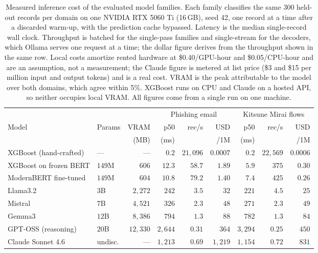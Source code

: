 \documentclass{jmlr}
\begin{document}
\begin{table}[tbp]
\centering
\caption{Measured inference cost of the evaluated model families. Each family classifies the same 300 held-out records per domain on one NVIDIA RTX 5060 Ti (16\,GB), seed 42, one record at a time after a discarded warm-up, with the prediction cache bypassed. Latency is the median single-record wall clock. Throughput is batched for the single-pass families and single-stream for the decoders, which Ollama serves one request at a time; the dollar figure derives from the throughput shown in the same row. Local costs amortize rented hardware at \$0.40/GPU-hour and \$0.05/CPU-hour and are an assumption, not a measurement; the Claude figure is metered at list price (\$3 and \$15 per million input and output tokens) and is a real cost. VRAM is the peak attributable to the model over both domains, which agree within 5\%. XGBoost runs on CPU and Claude on a hosted API, so neither occupies local VRAM. All figures come from a single run on one machine.}
\label{tab:cost-structure}
\footnotesize
\setlength{\tabcolsep}{4pt}
\begin{tabular}{@{}llrrrrrrr@{}}
\toprule
 & & & \multicolumn{3}{c}{Phishing email} & \multicolumn{3}{c}{Kitsune Mirai flows} \\
\cmidrule(lr){4-6}\cmidrule(lr){7-9}
Model & Params & VRAM & p50 & rec/s & USD & p50 & rec/s & USD \\
 & & (MB) & (ms) & & /1M & (ms) & & /1M \\
\midrule
XGBoost (hand-crafted) & --- & --- & $0.2$ & $21{,}096$ & $0.0007$ & $0.2$ & $22{,}569$ & $0.0006$ \\
XGBoost on frozen BERT & $149$M & $606$ & $12.3$ & $58.7$ & $1.89$ & $5.9$ & $375$ & $0.30$ \\
ModernBERT fine-tuned & $149$M & $604$ & $10.8$ & $79.2$ & $1.40$ & $7.4$ & $425$ & $0.26$ \\
Llama3.2 & $3$B & $2{,}272$ & $242$ & $3.5$ & $32$ & $221$ & $4.5$ & $25$ \\
Mistral & $7$B & $4{,}521$ & $326$ & $2.3$ & $48$ & $271$ & $2.3$ & $49$ \\
Gemma3 & $12$B & $8{,}386$ & $794$ & $1.3$ & $88$ & $782$ & $1.3$ & $84$ \\
GPT-OSS (reasoning) & $20$B & $12{,}330$ & $2{,}644$ & $0.31$ & $364$ & $3{,}294$ & $0.25$ & $450$ \\
Claude Sonnet 4.6 & undisc. & --- & $1{,}213$ & $0.69$ & $1{,}219$ & $1{,}154$ & $0.72$ & $831$ \\
\bottomrule
\end{tabular}
\end{table}
\end{document}
